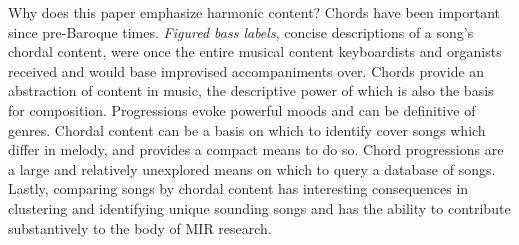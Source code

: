 Why does this paper emphasize harmonic content? Chords have been important since pre-Baroque times. \textit{Figured bass labels}, concise descriptions of a song's chordal content, were once the entire musical content keyboardists and organists received and would base improvised accompaniments over. Chords provide an abstraction of content in music\cite{de2008tonal}, the descriptive power of which is also the basis for composition. Progressions evoke powerful moods and can be definitive of genres. Chordal content can be a basis on which to identify cover songs which differ in melody, and provides a compact means to do so\cite{khadkevich2013large}. Chord progressions are a large and relatively unexplored means on which to query a database of songs. Lastly, comparing songs by chordal content has interesting consequences in clustering and identifying unique sounding songs and has the ability to contribute substantively to the body of MIR research.












